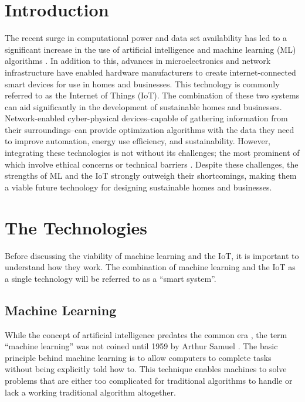 \documentclass[letterpaper]{article}
\begin{document}
\section{Introduction} \label{intro}
The recent surge in computational power and data set availability has led to a significant increase in the use of artificial intelligence and machine learning (ML) algorithms \cite{chan17}. In addition to this, advances in microelectronics and network infrastructure have enabled hardware manufacturers to create internet-connected smart devices for use in homes and businesses. This technology is commonly referred to as the Internet of Things (IoT). The combination of these two systems can aid significantly in the development of sustainable homes and businesses. Network-enabled cyber-physical devices--capable of gathering information from their surroundings--can provide optimization algorithms with the data they need to improve automation, energy use efficiency, and sustainability. However, integrating these technologies is not without its challenges; the most prominent of which involve ethical concerns or technical barriers \cite{perisic16, mccalman17, vlacheas13}. Despite these challenges, the strengths of ML and the IoT strongly outweigh their shortcomings, making them a viable future technology for designing sustainable homes and businesses.

\section{The Technologies} \label{info}
Before discussing the viability of machine learning and the IoT, it is important to understand how they work. The combination of machine learning and the IoT as a single technology will be referred to as a ``smart system''.

\subsection{Machine Learning} \label{MLinfo}
While the concept of artificial intelligence predates the common era \cite{mccorduck04}, the term ``machine learning'' was not coined until 1959 by Arthur Samuel \cite{samuel59}. The basic principle behind machine learning is to allow computers to complete tasks without being explicitly told how to. This technique enables machines to solve problems that are either too complicated for traditional algorithms to handle or lack a working traditional algorithm altogether.\par
\end{document}
